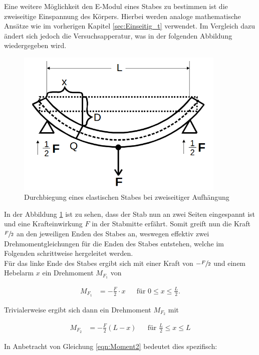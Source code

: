Eine weitere Möglichkeit den E-Modul eines Stabes zu bestimmen ist die zweiseitige Einspannung des Körpers. Hierbei werden
analoge mathematische Ansätze wie im vorherigen Kapitel \autoref{sec:Einseitig_t} verwendet. Im Vergleich dazu ändert sich jedoch 
die Versuchsapperatur, was in der folgenden Abbildung wiedergegeben wird.

\begin{figure}
    \centering
    \includegraphics[height=7cm]{./content/Zweiseitig.png}
    \caption{Durchbiegung eines elastischen Stabes bei zweiseitiger Aufhängung}
    \label{fig:Zweiseitig}
\end{figure}

\noindent In der Abbildung \ref{fig:Zweiseitig} ist zu sehen, dass der Stab nun an zwei Seiten eingespannt ist und eine Krafteinwirkung $F$
in der Stabmitte erfährt. Somit greift nun die Kraft $\sfrac{F}{2}$ an den jeweiligen Enden des Stabes an, weswegen effektiv
zwei Drehmomentgleichungen für die Enden des Stabes entstehen, welche im Folgenden schrittweise hergeleitet werden.\\
\noindent Für das linke Ende des Stabes ergibt sich mit einer Kraft von $-\sfrac{F}{2}$ und einem Hebelarm $x$ ein Drehmoment $M_{F_1}$ von

\begin{align*}
    M_{F_1} &= -\frac{F}{2}\cdot x & &\text{für}\,\, 0 \leq x \leq \frac{L}{2}.
\end{align*}

\noindent Trivialerweise ergibt sich dann ein Drehmoment $M_{F_2}$ mit

\begin{align*}
    M_{F_2} &= -\frac{F}{2}\left(L-x\right) & &\text{für}\,\, \frac{L}{2} \leq x \leq L 
\end{align*}

\noindent In Anbetracht von Gleichung \eqref{eqn:Moment2} bedeutet dies spezifisch:

